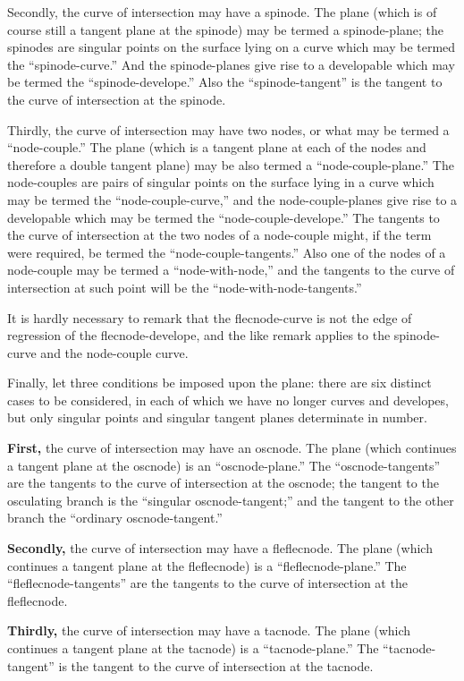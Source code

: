 \documentclass[11pt,a4paper]{book}
\begin{document}
Secondly, the curve of intersection may have a spinode. The plane (which is of course still a tangent plane at the spinode) may be termed a spinode-plane; the spinodes are singular points on the surface lying on a curve which may be termed the ``spinode-curve.'' And the spinode-planes give rise to a developable which may be termed the ``spinode-develope.'' Also the ``spinode-tangent'' is the tangent to the curve of intersection at the spinode.

Thirdly, the curve of intersection may have two nodes, or what may be termed a ``node-couple.'' The plane (which is a tangent plane at each of the nodes and therefore a double tangent plane) may be also termed a ``node-couple-plane.'' The node-couples are pairs of singular points on the surface lying in a curve which may be termed the ``node-couple-curve,'' and the node-couple-planes give rise to a developable which may be termed the ``node-couple-develope.'' The tangents to the curve of intersection at the two nodes of a node-couple might, if the term were required, be termed the ``node-couple-tangents.'' Also one of the nodes of a node-couple may be termed a ``node-with-node,'' and the tangents to the curve of intersection at such point will be the ``node-with-node-tangents.''

It is hardly necessary to remark that the flecnode-curve is not the edge of regression of the flecnode-develope, and the like remark applies to the spinode-curve and the node-couple curve.

Finally, let three conditions be imposed upon the plane: there are six distinct cases to be considered, in each of which we have no longer curves and developes, but only singular points and singular tangent planes determinate in number.

\textbf{First,} the curve of intersection may have an oscnode. The plane (which continues a tangent plane at the oscnode) is an ``oscnode-plane.'' The ``oscnode-tangents'' are the tangents to the curve of intersection at the oscnode; the tangent to the osculating branch is the ``singular oscnode-tangent;'' and the tangent to the other branch the ``ordinary oscnode-tangent.''

\textbf{Secondly,} the curve of intersection may have a fleflecnode. The plane (which continues a tangent plane at the fleflecnode) is a ``fleflecnode-plane.'' The ``fleflecnode-tangents'' are the tangents to the curve of intersection at the fleflecnode.

\textbf{Thirdly,} the curve of intersection may have a tacnode. The plane (which continues a tangent plane at the tacnode) is a ``tacnode-plane.'' The ``tacnode-tangent'' is the tangent to the curve of intersection at the tacnode.
\end{document}
